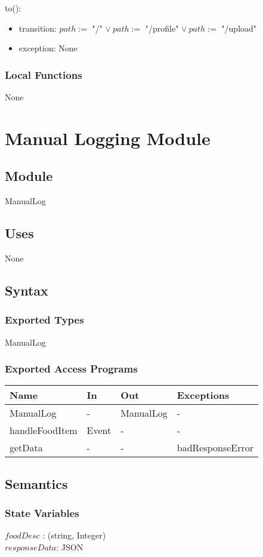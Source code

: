\documentclass[12pt, titlepage]{article}
\begin{document}
\noindent to():
\begin{itemize}
	\item transition: $path :=$ "/" $\lor \ path :=$ "/profile" $\lor \ path 
	:=$ 
	"/upload" 
	\item exception: None
\end{itemize}
\subsubsection{Local Functions}
None
\newpage
\section{Manual Logging Module} \label{ManualLogging}
\subsection{Module}
ManualLog
\subsection{Uses}
None
\subsection{Syntax}
\subsubsection{Exported Types}
ManualLog
\subsubsection{Exported Access Programs}
\begin{center}
	\begin{tabular}{p{3cm} p{4cm} p{4cm} p{2cm}}
		\hline
		\textbf{Name} & \textbf{In} & \textbf{Out} & \textbf{Exceptions} \\
		\hline
		ManualLog & - & ManualLog & - \\
		handleFoodItem & Event & - & - \\
		getData & - & - & badResponseError \\
		\hline
	\end{tabular}
\end{center}
\subsection{Semantics}
\subsubsection{State Variables}
$foodDesc$ : (string, Integer)\\
$responseData$: JSON
\end{document}
